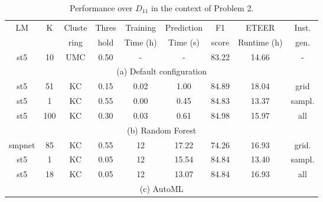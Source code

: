 \begin{table*}[t]
\setlength{\tabcolsep}{3pt}
\centering
\caption{Performance over $D_{11}$ in the context of Problem 2.
}
\label{tab:dbpedia-results}
\begin{tabular}{|c|c|c|c|c|c|c|c|c|}
\hline
\multirow{2}{*}{LM} & \multirow{2}{*}{K} & Cluste & Thres & Training & Prediction & F1 & ETEER  & Inst. \\
 & & ring & hold& Time (h) & Time (s) & score & Runtime (h) &  gen. \\
\hline
\hline
st5 & 10 & UMC & 0.50 & - & - & 83.22 & 14.66 & - \\
\hline
\multicolumn{9}{c}{(a) Default configuration}\\
\hline
st5 & 51 & KC & 0.15 & 0.02 & 1.00 & 84.89 & 18.04 & grid \\
st5 & 1 & KC & 0.55 & 0.00 & 0.45 & 84.83 & 13.37 & sampl. \\
st5 & 100 & KC & 0.30 & 0.03 & 0.61 & 84.98 & 15.97 & all \\
\hline
\multicolumn{9}{c}{(b) Random Forest}\\
\hline
smpnet & 85 & KC & 0.55 & 12 & 17.22 & 74.26 & 16.93 & grid. \\
st5 & 1 & KC & 0.05 & 12 & 15.54 & 84.84 & 13.40 & sampl. \\
st5 & 18 & KC & 0.05 & 12 & 13.07 & 84.84 & 16.93 &  all \\
\hline
\multicolumn{9}{c}{(c) AutoML}
\end{tabular}
\vspace{-9pt}
\end{table*} 